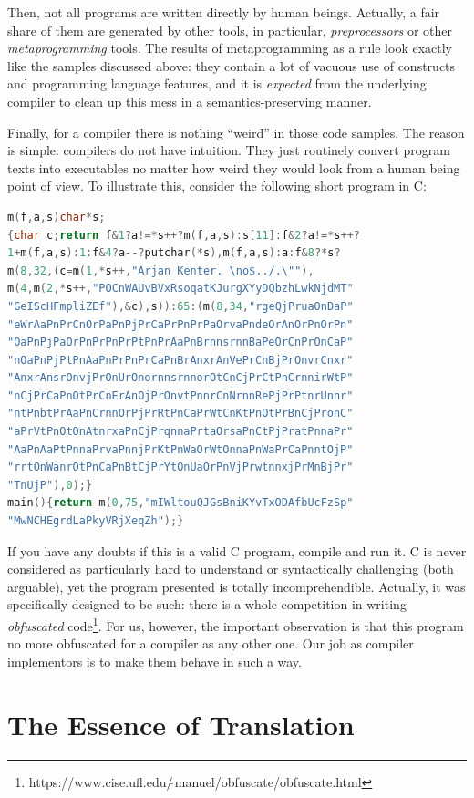 \documentclass{book}
\newcommand{\lang}[1]{\textsc{#1}}
\begin{document}
Then, not all programs are written directly by human beings. Actually, a fair share of them are generated by other tools, in particular, \emph{preprocessors}
or other \emph{metaprogramming} tools. The results of metaprogramming as a rule look exactly like the samples discussed above: they contain a lot
of vacuous use of constructs and programming language features, and it is \emph{expected} from the underlying compiler to clean up this mess
in a semantics-preserving manner.

Finally, for a compiler there is nothing ``weird'' in those code samples. The reason is simple: compilers do not have intuition. They just 
routinely convert program texts into executables no matter how weird they would look from a human being point of view. To illustrate this,
consider the following short program in \lang{C}: 

\begin{lstlisting}[language=cc]
m(f,a,s)char*s;
{char c;return f&1?a!=*s++?m(f,a,s):s[11]:f&2?a!=*s++?
1+m(f,a,s):1:f&4?a--?putchar(*s),m(f,a,s):a:f&8?*s?
m(8,32,(c=m(1,*s++,"Arjan Kenter. \no$../.\""),
m(4,m(2,*s++,"POCnWAUvBVxRsoqatKJurgXYyDQbzhLwkNjdMT"
"GeIScHFmpliZEf"),&c),s)):65:(m(8,34,"rgeQjPruaOnDaP"
"eWrAaPnPrCnOrPaPnPjPrCaPrPnPrPaOrvaPndeOrAnOrPnOrPn"
"OaPnPjPaOrPnPrPnPrPtPnPrAaPnBrnnsrnnBaPeOrCnPrOnCaP"
"nOaPnPjPtPnAaPnPrPnPrCaPnBrAnxrAnVePrCnBjPrOnvrCnxr"
"AnxrAnsrOnvjPrOnUrOnornnsrnnorOtCnCjPrCtPnCrnnirWtP"
"nCjPrCaPnOtPrCnErAnOjPrOnvtPnnrCnNrnnRePjPrPtnrUnnr"
"ntPnbtPrAaPnCrnnOrPjPrRtPnCaPrWtCnKtPnOtPrBnCjPronC"
"aPrVtPnOtOnAtnrxaPnCjPrqnnaPrtaOrsaPnCtPjPratPnnaPr"
"AaPnAaPtPnnaPrvaPnnjPrKtPnWaOrWtOnnaPnWaPrCaPnntOjP"
"rrtOnWanrOtPnCaPnBtCjPrYtOnUaOrPnVjPrwtnnxjPrMnBjPr"
"TnUjP"),0);}
main(){return m(0,75,"mIWltouQJGsBniKYvTxODAfbUcFzSp"
"MwNCHEgrdLaPkyVRjXeqZh");}
\end{lstlisting}

If you have any doubts if this is a valid \lang{C} program, compile and run it. \lang{C} is never considered as particularly hard to
understand or syntactically challenging (both arguable), yet the program presented is totally incomprehendible. Actually, it
was specifically designed to be such: there is a whole competition in writing \emph{obfuscated}
code\footnote{https://www.cise.ufl.edu/$\tilde\,$manuel/obfuscate/obfuscate.html}. For us, however, the important observation is that this
program no more obfuscated for a compiler as any other one. Our job as compiler implementors is to make them behave in such a way.


\section{The Essence of Translation}
\end{document}
